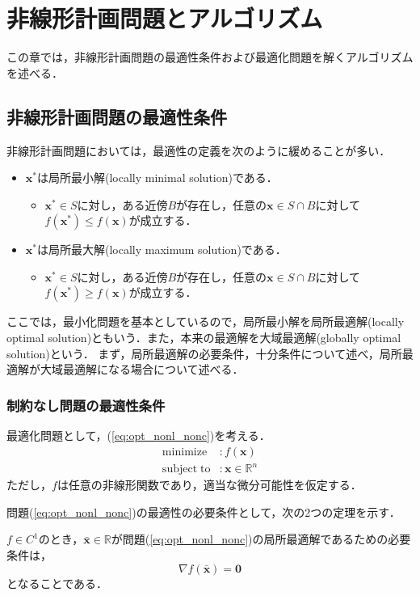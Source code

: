 \documentclass{jsreport}
\begin{document}
\chapter{非線形計画問題とアルゴリズム}
この章では，非線形計画問題の最適性条件および最適化問題を解くアルゴリズムを述べる．
\section{非線形計画問題の最適性条件}
非線形計画問題においては，最適性の定義を次のように緩めることが多い．
\begin{itemize}
  \item $\bm{x}^*$は局所最小解(locally minimal solution)である．
  \begin{itemize}
    \item $\bm{x}^* \in S$に対し，ある近傍$B$が存在し，任意の$\bm{x} \in S \cap B$に対して$f(\bm{x}^*) \leq f(\bm{x})$が成立する．
  \end{itemize}
  \item $\bm{x}^*$は局所最大解(locally maximum solution)である．
  \begin{itemize}
    \item $\bm{x}^* \in S$に対し，ある近傍$B$が存在し，任意の$\bm{x} \in S \cap B$に対して$f(\bm{x}^*) \geq f(\bm{x})$が成立する．
  \end{itemize}
\end{itemize}

ここでは，最小化問題を基本としているので，局所最小解を局所最適解(locally optimal solution)ともいう．また，本来の最適解を大域最適解(globally optimal solution)という．
まず，局所最適解の必要条件，十分条件について述べ，局所最適解が大域最適解になる場合について述べる．

\subsection{制約なし問題の最適性条件}
最適化問題として，(\ref{eq:opt_nonl_nonc})を考える．
\begin{align}\label{eq:opt_nonl_nonc}
  \mathrm{minimize} &: f(\bm{x}) \nonumber\\
  \mathrm{subject \; to} &: \bm{x} \in \mathbb{R}^n
\end{align}
ただし，$f$は任意の非線形関数であり，適当な微分可能性を仮定する．

問題(\ref{eq:opt_nonl_nonc})の最適性の必要条件として，次の2つの定理を示す．
\begin{theo}\label{theo:opt_nonl_nonc_h_1}
  $f \in C^{1}$のとき，$\bar{\bm{x}} \in \mathbb{R}$が問題(\ref{eq:opt_nonl_nonc})の局所最適解であるための必要条件は，
  \begin{equation}
    \nabla f(\bar{\bm{x}}) = \bm{0} \nonumber
  \end{equation}
  となることである．
\end{theo}
\end{document}
